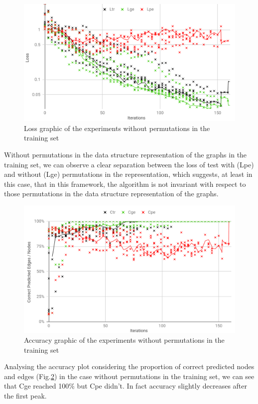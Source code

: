 \begin{figure}[H]
    \centering
    \includegraphics[width=.9\linewidth]
    {fig/content/results/shapes/base/loss.png}
    \caption{Loss graphic of the experiments without permutations in the training set}
    \label{fig:regions_separation_base_loss}
\end{figure}

Without permutations in the data structure representation of the graphs in the training set, we can observe a clear separation between the loss of test with (Lpe) and without (Lge) permutations in the representation, which suggests, at least in this case, that in this framework, the algorithm is not invariant with respect to those permutations in the data structure representation of the graphs.

\begin{figure}[H]
    \centering
    \includegraphics[width=.9\linewidth]
    {fig/content/results/shapes/base/correct.png}
    \caption{Accuracy graphic of the experiments without permutations in the training set}
    \label{fig:regions_separation_base_accuracy}
\end{figure}

Analysing the accuracy plot considering the proportion of correct predicted nodes and edges (Fig.\ref{fig:regions_separation_base_accuracy}) in the case without permutations in the training set, we can see that Cge reached 100\% but Cpe didn't. In fact accuracy slightly decreases after the first peak.

